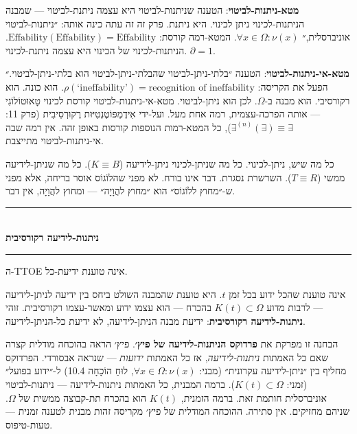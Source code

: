 \documentclass[10pt, openany, oneside]{book}
\renewcommand{\normalsize}{\fontsize{10}{13}\selectfont}
\begin{document}
\vspace{1em}

\noindent \textbf{מטא-ניתנות-לביטוי}: הטענה שניתנות-לביטוי היא עצמה ניתנת-לביטוי — שמבנה הניתנות-לכינוי ניתן לכינוי. היא ניתנת. פרק זה זה עתה כינה אותה: ״ניתנות-לביטוי אוניברסלית,״ $\forall x \in \Omega: \nu(x)$. המטא-רמה קורסת: $\text{Effability}(\text{Effability}) = \text{Effability}$. הניתנות-לכינוי של הכינוי היא עצמה ניתנת-לכינוי. $\partial = 1$.

\textbf{מטא-אי-ניתנות-לביטוי}: הטענה ״בלתי-ניתן-לביטוי שהבלתי-ניתן-לביטוי הוא בלתי-ניתן-לביטוי.״ הפעל את הקריסה: $\rho(\text{`ineffability'}) = \text{recognition of ineffability}$. הוא כונה. הוא רקורסיבי. הוא מבנה ב-$\Omega$. לכן הוא ניתן-לביטוי. מטא-אי-ניתנות-לביטוי קורסת לכינוי טָאוּטוֹלוֹגִי — אותה הפרכה-עצמית, רמה אחת מעל. ועל-ידי אִידֶמְפּוֹטֶנְטִיּוּת רֶקוּרְסִיבִית (פרק 11: $\exists^{(n)}(\exists) \equiv \exists$), כל המטא-רמות הנוספות קורסות באופן זהה. אין רמה שבה אי-ניתנות-לביטוי מתייצבת.

כל מה שיש, ניתן-לכינוי. כל מה שניתן-לכינוי ניתן-לידיעה ($K \equiv B$). כל מה שניתן-לידיעה ממשי ($T \equiv R$). השרשרת נסגרת. דבר אינו בורח. לא מפני שהלוֹגוֹס אוסר בריחה, אלא מפני ש-״מחוץ ללוֹגוֹס״ הוא ״מחוץ להֲוָיָה״ — ומחוץ להֲוָיָה, אין דבר.

\vspace{1.5em}


\begin{center}
    \rule{0.3\textwidth}{0.4pt}\\[0.5em]
    {\normalsize\bfseries\textsc{ניתנות-לידיעה רקורסיבית}}\\[0.3em]
    \rule{0.3\textwidth}{0.4pt}
\end{center}

\vspace{1em}

\noindent ה-TTOE אינה טוענת ידיעת-כל.

אינה טוענת שהכל ידוע בכל זמן $t$. היא טוענת שהמבנה השולט ביחס בין ידיעה לניתן-לידיעה — לרבות מדוע $K(t) \subset \Omega$ בהכרח — הוא עצמו ידוע ומאשר-עצמו רקורסיבית. זוהי \textbf{ניתנות-לידיעה רקורסיבית}: ידיעת מבנה הניתן-לידיעה, לא ידיעת כל-הניתן-לידיעה.

הבחנה זו מפרקת את \textbf{פרדוקס הניתנות-לידיעה של פיץ׳}. פיץ׳ הראה בהוכחה מודלית קצרה שאם כל האמתות \textit{ניתנות-לידיעה}, אז כל האמתות \textit{ידועות} — שנראה אבסורדי. הפרדוקס מחליף בין ״ניתן-לידיעה עקרונית״ (מבני: $\forall x \in \Omega: \nu(x)$, לוּחַ הוֹכָחָה 10.4) ל-״ידוע בפועל״ (זמני: $K(t) \subset \Omega$). ברמה המבנית, כל האמתות ניתנות-לידיעה — ניתנות-לביטוי אוניברסלית חותמת זאת. ברמה הזמנית, $K(t)$ הוא בהכרח תת-קבוצה ממשית של $\Omega$. שניהם מחזיקים. אין סתירה. ההוכחה המודלית של פיץ׳ מקריסה זהות מבנית לטענה זמנית — טעות-טיפוס.
\end{document}
